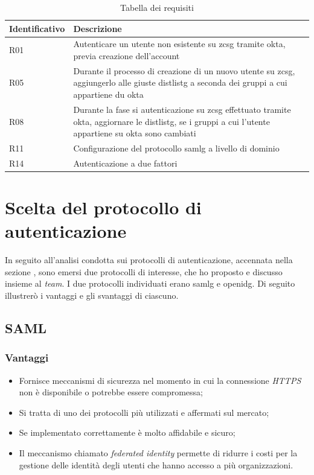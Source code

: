\begin{center}
    \begin{table}[h]
    \begin{tabular}{| l | p{10cm} |} %
        \hline
        \textbf{Identificativo} & \textbf{Descrizione} \\ \hline  
        R01 & Autenticare un utente non esistente su \gls{zcsg} tramite \gls{okta}, previa creazione dell'account\\ \hline
        R05 & Durante il processo di creazione di un nuovo utente su \gls{zcsg}, aggiungerlo alle giuste \gls{distlistg} a seconda dei gruppi a cui appartiene du \gls{okta}\\ \hline
        R08 & Durante la fase si autenticazione su \gls{zcsg} effettuato tramite \gls{okta}, aggiornare le \gls{distlistg}, se i gruppi a cui l'utente appartiene su \gls{okta} sono cambiati\\ \hline
        R11 & Configurazione del protocollo \gls{samlg} a livello di dominio\\ \hline
        R14 & Autenticazione a due fattori\\ \hline 
    \end{tabular}
    \caption{Tabella dei requisiti}
    \end{table}
\end{center}
\newpage

\section{Scelta del protocollo di autenticazione}
In seguito all'analisi condotta sui protocolli di autenticazione, accennata nella sezione , sono emersi due protocolli di interesse, che ho proposto e discusso insieme al \textit{team}.
I due protocolli individuati erano \gls{samlg} e \gls{openidg}. Di seguito illustrerò i vantaggi e gli svantaggi di ciascuno.

\subsection{SAML}
    \subsubsection{Vantaggi}
    \begin{itemize}
        \item Fornisce meccanismi di sicurezza nel momento in cui la connessione \textit{HTTPS} non è disponibile o potrebbe essere compromessa;
        \item Si tratta di uno dei protocolli più utilizzati e affermati sul mercato;
        \item Se implementato correttamente è molto affidabile e sicuro;
        \item Il meccanismo chiamato \textit{federated identity} permette di ridurre i costi per la gestione delle identità degli utenti che hanno accesso a più organizzazioni.
    \end{itemize}
